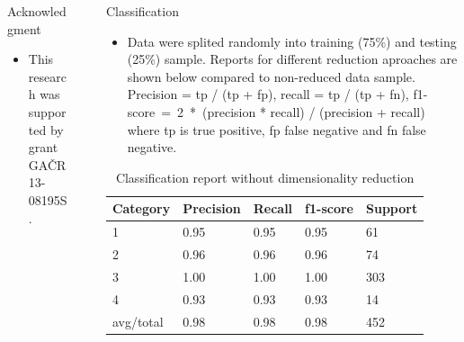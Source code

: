 \documentclass[final,hyperref={pdfpagelabels=false}]{beamer}
\begin{document}
\begin{frame}[t]
\begin{columns}[t]
\begin{column}{.465\textwidth}
\begin{block}{Acknowledgment}

\begin{itemize}
\item This research was supported by grant GAČR 13-08195S.
\end{itemize}

\end{block}



\end{column} %

\begin{column}{.03\textwidth}\end{column} %
 
\begin{column}{.465\textwidth} %


\begin{block}{Classification}
\begin{itemize}
\item Data were splited randomly into training (75\%) and testing (25\%) sample. Reports for different reduction aproaches are shown below compared to non-reduced data sample. Precision =  tp / (tp + fp), recall = tp / (tp + fn), f1-score~=~2~*~(precision * recall) / (precision + recall) where tp is true positive, fp false negative and fn false negative.
\end{itemize}

\begin{table}
\begin{tabular}{l l l l l}
\toprule
\textbf{Category} & \textbf{Precision} & \textbf{Recall} & \textbf{f1-score} & \textbf{Support}\\
\midrule
1 &      0.95	&  0.95	 &   0.95 &      61 \\ 
2 &      0.96	&  0.96	 &   0.96 &      74 \\ 
3 &      1.00	&  1.00	 &   1.00 &      303\\ 
4 &      0.93	&  0.93	 &   0.93 &      14 \\ 
\midrule
avg/total   & 0.98   &   0.98  &    0.98  &     452 \\
\bottomrule
\end{tabular}
\caption{Classification report without dimensionality reduction}
\end{table}



\end{block}
\end{column}
\end{columns}
\end{frame}
\end{document}
